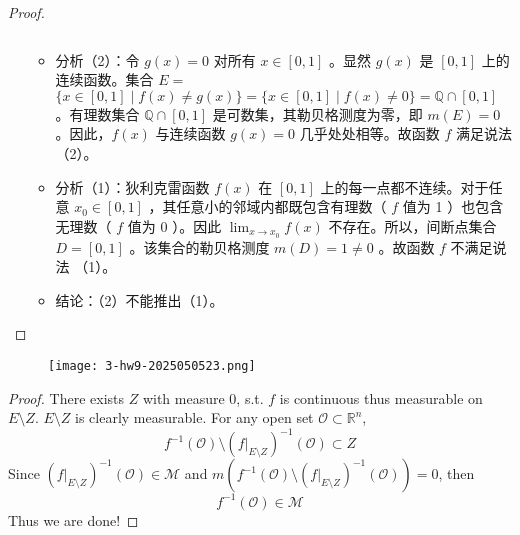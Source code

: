 \begin{proof}
\begin{enumerate}
\begin{itemize}
\[\]		\item 分析（2）：令 $g(x)=0$ 对所有 $x \in[0,1]$ 。显然 $g(x)$ 是 $[0,1]$ 上的连续函数。集合 $E=$ $\{x \in[0,1] \mid f(x) \neq g(x)\}=\{x \in[0,1] \mid f(x) \neq 0\}=\mathbb{Q} \cap[0,1]$ 。有理数集合 $\mathbb{Q} \cap[0,1]$ 是可数集，其勒贝格测度为零，即 $m(E)=0$ 。因此，$f(x)$ 与连续函数 $g(x)=0$ 几乎处处相等。故函数 $f$ 满足说法（2）。
		\item 分析（1）：狄利克雷函数 $f(x)$ 在 $[0,1]$ 上的每一点都不连续。对于任意 $x_0 \in[0,1]$ ，其任意小的邻域内都既包含有理数（ $f$ 值为 1 ）也包含无理数（ $f$ 值为 0 ）。因此 $\lim _{x \rightarrow x_0} f(x)$ 不存在。所以，间断点集合 $D=[0,1]$ 。该集合的勒贝格测度 $m(D)=1 \neq 0$ 。故函数 $f$ 不满足说法 （1）。
		\item 结论：（2）不能推出（1）。
	\end{itemize}
\end{enumerate}

\end{proof}

\begin{exercise}
\begin{figure}[H]
\centering
\texttt{[image: 3-hw9-2025050523.png]}
\label{}
\end{figure}\label{675d91}
\end{exercise}

\begin{proof}
There exists $Z$ with measure 0, s.t. $f$ is continuous thus measurable on $E\setminus Z$. $E\setminus Z$ is clearly measurable. For any open set $\mathcal{O}\subset \mathbb{R}^{n}$,
\[
f^{-1}(\mathcal{O})\setminus(\left.f\right|_{E\setminus Z})^{-1}(\mathcal{O})\subset Z
\]
Since $(\left. f\right|_{E\setminus Z})^{-1}(\mathcal{O})\in \mathcal{M}$ and $m(f^{-1}(\mathcal{O})\setminus(\left.f\right|_{E\setminus Z})^{-1}(\mathcal{O}))=0$, then
\[
f^{-1}(\mathcal{O})\in \mathcal{M}
\]
Thus we are done!

\end{proof}

